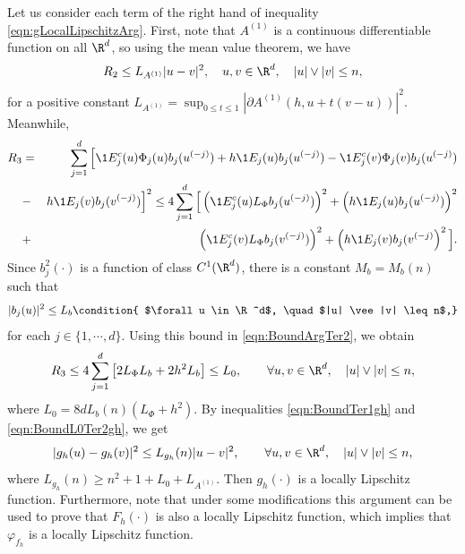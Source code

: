 \documentclass[sort&compress, preprint]{elsarticle}
\theoremstyle{definition}
\theoremstyle{plain}%
\theoremstyle{remark}
\begin{document}
\begin{pf}
	Let us consider each term of the right hand of inequality \eqref{eqn:gLocalLipschitzArg}.
	First, note that $A^{(1)}$ is a continuous differentiable function on all 
	$\R^d$, so using the mean value theorem,
	we have
	\begin{equation}\label{eqn:BoundTer1gh}
		R_2
		\leq
		L_{A^{(1)}}|u-v|^2, \quad u,v \in \R^d, \quad |u|\vee |v|\leq n,
	\end{equation}
	for a positive constant $L_{A^{(1)}} =\sup_{0\leq t \leq 1} 
		|\partial A^{(1)}(h, u+t(v-u))|^2$. Meanwhile, 
	\begin{eqnarray}
	R_3 &=&\sum_{j=1}^d\Big[\1{E_j^c}(u) \Phi_j(u) b_j(u^{(-j)}) + h \1{E_j}(u) b_j(u^{(-j)}) 
			-\1{E_j^c}(v) \Phi_j(v) b_j(u^{(-j)})\nonumber \\ &-& h \1{E_j}(v) b_j(v^{(-j)})
			\Big]^2 
			\leq
			4\sum_{j=1}^d
			\Big[
				\left(	
					\1{E_j^c}(u) L_{\Phi} b_j(u^{(-j)})  
				\right)^2
				+
				\left(
					h \1{E_j}(u) b_j(u^{(-j)})
				\right)^2
				\nonumber\\&+&
				\left(
					\1{E_j^c}(v) L_{\Phi} b_j(v^{(-j)})
				\right)^2
				+
				\left(
				 h \1{E_j}(v) b_j(v^{(-j)}
				\right)^2
			\Big].
		\label{eqn:BoundArgTer2}	
	\end{eqnarray}	
	Since  $b^2_j(\cdot)$ is a function of class $C^1(\R^d)$, there is a 
	constant $M_b=M_b(n)$ such that
	\begin{dmath}[label={eqn:Boundbju}]
		|b_j(u)|^2 \leq L_b 
		\condition{
			$\forall u \in \R^d$,
			\quad $|u| \vee |v| \leq n$,}		
	\end{dmath}
	for each $j \in \{1,\cdots, d\}$. Using this bound in  \eqref{eqn:BoundArgTer2}, we obtain
	\begin{equation}\label{eqn:BoundL0Ter2gh}
			R_3\leq
			4 \sum_{j=1}^d
				\left[
					2 L_{\Phi} L_b +2h^2 L_b
				\right] 
			\leq L_0, \qquad
				\forall u,v \in \R^d,
				\quad |u|\vee|v| \leq n,
	\end{equation}
	where $L_0=8d L_b(n)(L_{\Phi}+h^2)$.
	By inequalities \eqref{eqn:BoundTer1gh} and \eqref{eqn:BoundL0Ter2gh},  we get
	\begin{equation}
			|g_h(u) - g_h(v)|^2 \leq L_{g_h}(n) |u - v|^2, 
			\qquad	\forall u,v \in \R^d,
				\quad |u|\vee |v| \leq n,		
	\end{equation}
	 where $L_{g_h}(n)\geq n^2+1+L_0+ L_{A^{(1)}}$. Then $g_h(\cdot)$ is a locally 
	 Lipschitz function. Furthermore, note that under some modifications
	this argument can be used to prove that $F_h(\cdot)$ is also a locally Lipschitz 
	function, which implies that $\varphi_{f_{h}}$ is a locally Lipschitz function.

\end{pf}
\end{document}
